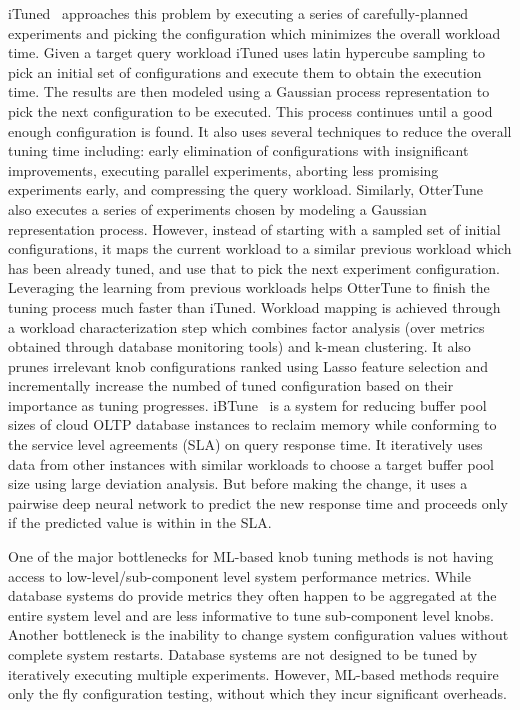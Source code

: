 iTuned~\cite{ituned} approaches this problem by executing a series of carefully-planned experiments and picking the configuration which minimizes the overall workload time.
Given a target query workload iTuned uses latin hypercube sampling to pick an initial set of configurations and execute them to obtain the execution time.
The results are then modeled using a Gaussian process representation to pick the next configuration to be executed.
This process continues until a good enough configuration is found.
It also uses several techniques to reduce the overall tuning time including: early elimination of configurations with insignificant improvements, executing parallel experiments, aborting less promising experiments early, and compressing the query workload.
Similarly, OtterTune~\cite{ottertune} also executes a series of experiments chosen by modeling a Gaussian representation process.
However, instead of starting with a sampled set of initial configurations, it maps the current workload to a similar previous workload which has been already tuned, and use that to pick the next experiment configuration.
Leveraging the learning from previous workloads helps OtterTune to finish the tuning process much faster than iTuned.
Workload mapping is achieved through a workload characterization step which combines factor analysis (over metrics obtained through database monitoring tools) and k-mean clustering.
It also prunes irrelevant knob configurations ranked using Lasso feature selection and incrementally increase the numbed of tuned configuration based on their importance as tuning progresses.
iBTune~\cite{ibtune} is a system for reducing buffer pool sizes of cloud OLTP database instances to reclaim memory while conforming to the service level agreements (SLA) on query response time.
It iteratively uses data from other instances with similar workloads to choose a target buffer pool size using large deviation analysis.
But before making the change, it uses a pairwise deep neural network to predict the new response time and proceeds only if the predicted value is within in the SLA.

One of the major bottlenecks for ML-based knob tuning methods is not having access to low-level/sub-component level system performance metrics.
While database systems do provide metrics they often happen to be aggregated at the entire system level and are less informative to tune sub-component level knobs.
Another bottleneck is the inability to change system configuration values without complete system restarts.
Database systems are not designed to be tuned by iteratively executing multiple experiments. 
However, ML-based methods require only the fly configuration testing, without which they incur significant overheads.


